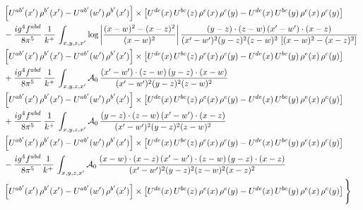 \documentclass[9pt]{article}
\numberwithin{equation}{section}
\begin{document}
\begin{align}
& \left[U^{ab'}(x')\,\rho^{b'}(x')-U^{ab'}(w')\, \rho^{b'}(x')\right]\times \left[U^{de}(x)\,U^{bc}(z)\, \rho^{e}(x)\,\rho^{c}(y)-U^{de}(x)\,U^{bc}(y)\,\rho^{e}(x)\,\rho^{c}(y)\right] \notag \\
& -\frac{ig^{4}f^{abd}}{8\pi^{5}}\,\frac{1}{k^{+}}\,\int_{x,y,z,x'}\log{\left|\frac{(x-w)^{2}-(x-z)^{2}}{(x-w)^{2}}\right|}\,
\frac{(y-z)\cdot(z-w)\,(x'-w')\cdot(x-z)}{(x'-w')^{2}(y-z)^{2}(z-w)^{2}\,\left[(x-w)^{2}-(x-z)^{2}\right]}\notag \\ & \left[U^{ab'}(x')\,\rho^{b'}(x')-U^{ab'}(w')\, \rho^{b'}(x')\right]\times \left[U^{de}(x)\,U^{bc}(z)\, \rho^{e}(x)\,\rho^{c}(y)-U^{de}(x)\,U^{bc}(y)\,\rho^{e}(x)\,\rho^{c}(y)\right] \notag \\
& +\frac{ig^{4}f^{abd}}{8\pi^{5}}\,\frac{1}{k^{+}}\,\int_{x,y,z,x'}\mathcal{A}_{0}\,
\frac{(x'-w')\cdot(z-w)\,(y-z)\cdot(x-w)}{(x'-w')^{2}(y-z)^{2}(z-w)^{2}}\notag \\
& \left[U^{ab'}(x')\,\rho^{b'}(x')-U^{ab'}(w')\, \rho^{b'}(x')\right]\times \left[U^{de}(x)\,U^{bc}(z)\, \rho^{e}(x)\,\rho^{c}(y)-U^{de}(x)\,U^{bc}(y)\,\rho^{e}(x)\,\rho^{c}(y)\right] \notag \\
& +\frac{ig^{4}f^{abd}}{8\pi^{5}}\,\frac{1}{k^{+}}\,\int_{x,y,z,x'}\mathcal{A}_{0}\,
\frac{(y-z)\cdot(z-w)\,(x'-w')\cdot(x-z)}{(x'-w')^{2}(y-z)^{2}(z-w)^{2}}\notag \\ & \left[U^{ab'}(x')\,\rho^{b'}(x')-U^{ab'}(w')\, \rho^{b'}(x')\right]\times \left[U^{de}(x)\,U^{bc}(z)\, \rho^{e}(x)\,\rho^{c}(y)-U^{de}(x)\,U^{bc}(y)\,\rho^{e}(x)\,\rho^{c}(y)\right] \notag \\
& -\frac{ig^{4}f^{abd}}{8\pi^{5}}\frac{1}{k^{+}}\,\int_{x,y,z,x'}\mathcal{A}_{0}\,
\frac{(x-w)\cdot(x-z)\,(x'-w')\cdot(z-w)\,(y-z)\cdot(x-z)}{(x'-w')^{2}(y-z)^{2}(z-w)^{2}(x-z)^{2}}\notag \\ & \left[U^{ab'}(x')\,\rho^{b'}(x')-U^{ab'}(w')\, \rho^{b'}(x')\right]\times \left[U^{de}(x)\,U^{bc}(z)\, \rho^{e}(x)\,\rho^{c}(y)-U^{de}(x)\,U^{bc}(y)\,\rho^{e}(x)\,\rho^{c}(y)\right]\Bigg\}
\end{align}
\end{document}
